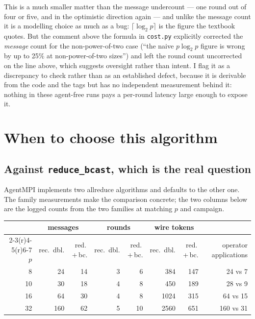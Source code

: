 \documentclass[11pt]{article}
\begin{document}
This is a much smaller matter than the message undercount --- one round out of four or five, and
in the optimistic direction again --- and unlike the message count it is a modelling choice as
much as a bug: $\lceil\log_2 p\rceil$ is the figure the textbook quotes. But the comment above
the formula in \texttt{cost.py} explicitly corrected the \emph{message} count for the
non-power-of-two case (``the naive $p\log_2 p$ figure is wrong by up to 25\% at non-power-of-two
sizes'') and left the round count uncorrected on the line above, which suggests oversight rather
than intent. I flag it as a discrepancy to check rather than as an established defect, because it
is derivable from the code and the tags but has no independent measurement behind it: nothing in
these agent-free runs pays a per-round latency large enough to expose it.

\section{When to choose this algorithm}

\subsection{Against \texttt{reduce\_bcast}, which is the real question}

AgentMPI implements two allreduce algorithms and defaults to the other one. The family
measurements make the comparison concrete; the two columns below are the logged counts from the
two families at matching $p$ and campaign.

\begin{center}\footnotesize
\begin{tabular}{@{}rrrrrrrr@{}}
\toprule
  & \multicolumn{2}{c}{messages} & \multicolumn{2}{c}{rounds} & \multicolumn{2}{c}{wire tokens} & \\
  \cmidrule(r){2-3}\cmidrule(r){4-5}\cmidrule(r){6-7}
  $p$ & rec.\ dbl. & red.\,+\,bc. & rec.\ dbl. & red.\,+\,bc. & rec.\ dbl. & red.\,+\,bc. & operator applications \\
\midrule
  8  & 24  & 14 & 3 & 6  & 384  & 147 & 24 vs 7 \\
  10 & 30  & 18 & 4 & 8  & 450  & 189 & 28 vs 9 \\
  16 & 64  & 30 & 4 & 8  & 1024 & 315 & 64 vs 15 \\
  32 & 160 & 62 & 5 & 10 & 2560 & 651 & 160 vs 31 \\
\bottomrule
\end{tabular}\normalsize
\end{center}
\end{document}
